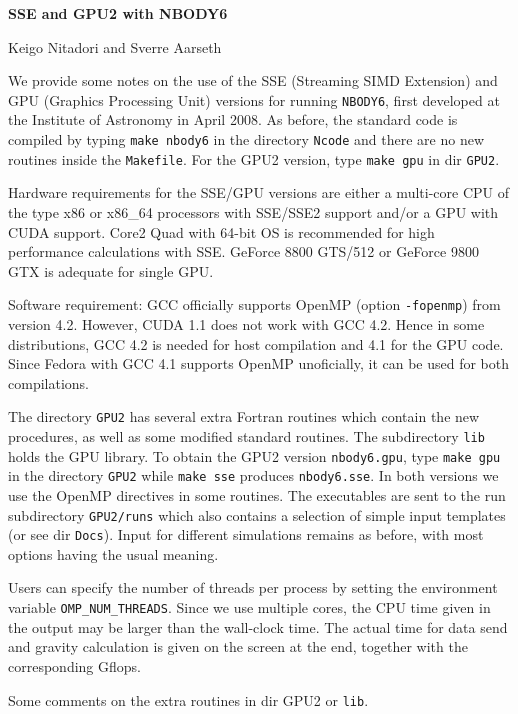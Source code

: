 \documentclass[12pt]{article}
\begin{document}
\centerline {\Large {\bf {SSE and GPU2 with NBODY6}}}
\bigskip
\bigskip
\centerline {\Large {Keigo Nitadori and Sverre Aarseth~~~}}
\bigskip
\medskip
\bigskip
We provide some notes on the use of the SSE (Streaming SIMD Extension)
and GPU (Graphics Processing Unit) versions for running
{\tt NBODY6}, first developed at the Institute of Astronomy in April 2008. 
As before, the standard code is compiled by typing {\tt make nbody6} in the
directory {\tt Ncode} and there are no new routines inside the {\tt Makefile}.
For the GPU2 version, type {\tt make gpu} in dir {\tt GPU2}.
\medskip

Hardware requirements for the SSE/GPU versions are either a multi-core
CPU of the type x86 or x86\_64 processors with SSE/SSE2 support and/or
a GPU with CUDA support. Core2 Quad with 64-bit OS is recommended for high
performance calculations with SSE.
GeForce 8800 GTS/512 or GeForce 9800 GTX is adequate for single GPU.
\medskip

Software requirement: GCC officially supports OpenMP (option {\tt -fopenmp}) from
version 4.2.
However, CUDA 1.1 does not work with GCC 4.2.
Hence in some distributions, GCC 4.2 is needed for host compilation and
4.1 for the GPU code.
Since Fedora with GCC 4.1 supports OpenMP unoficially, it can be used
for both compilations.

\medskip

The directory {\tt GPU2} has several extra Fortran routines which contain the
new procedures, as well as some modified standard routines.
The subdirectory {\tt lib} holds the GPU library.
To obtain the GPU2 version {\tt nbody6.gpu}, type {\tt make gpu} in the 
directory {\tt GPU2} while {\tt make sse} produces {\tt nbody6.sse}.
In both versions we use the OpenMP directives in some routines.
The executables are sent to the run subdirectory {\tt GPU2/runs} which
also contains a selection of simple input templates (or see dir {\tt Docs}).
Input for different simulations remains as before, with most options
having the usual meaning.
\medskip

Users can specify the number of threads per process by setting the
environment variable {\tt OMP\_NUM\_THREADS}.
Since we use multiple cores, the CPU time given in the output may be
larger than the wall-clock time. The actual time for data send and gravity
calculation is given on the screen at the end, together with the
corresponding Gflops.

\medskip
Some comments on the extra routines in dir GPU2 or {\tt lib}.
\end{document}
